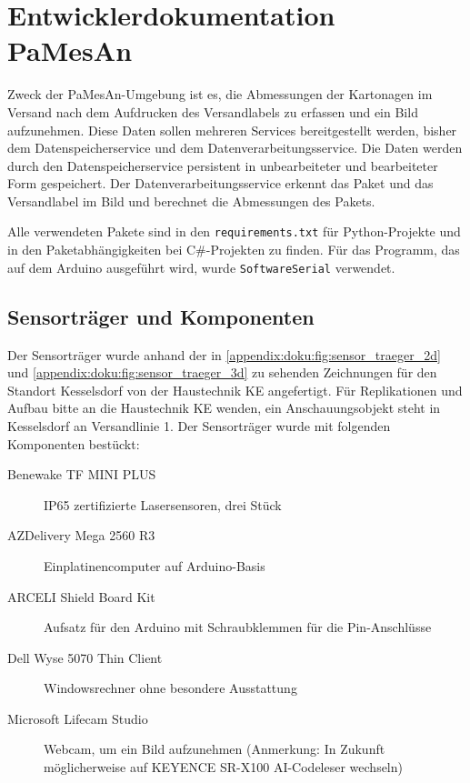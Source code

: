 \section{Entwicklerdokumentation PaMesAn}\label{appendix:sec:dokumentation}

Zweck der PaMesAn-Umgebung ist es, die Abmessungen der Kartonagen im Versand nach dem Aufdrucken des Versandlabels zu erfassen und ein Bild aufzunehmen. Diese Daten sollen mehreren Services bereitgestellt werden, bisher dem Datenspeicherservice und dem Datenverarbeitungsservice. Die Daten werden durch den Datenspeicherservice persistent in unbearbeiteter und bearbeiteter Form gespeichert. Der Datenverarbeitungsservice erkennt das Paket und das Versandlabel im Bild und berechnet die Abmessungen des Pakets.

Alle verwendeten Pakete sind in den \texttt{requirements.txt} für Python-Projekte und in den Paketabhängigkeiten bei C\#-Projekten zu finden. Für das Programm, das auf dem Arduino ausgeführt wird, wurde \texttt{SoftwareSerial} verwendet.


\subsection{Sensorträger und Komponenten}\label{appendix:ssec:doku:sensortraeger}

Der Sensorträger wurde anhand der in \vref{appendix:doku:fig:sensor_traeger_2d} und \vref{appendix:doku:fig:sensor_traeger_3d} zu sehenden Zeichnungen für den Standort Kesselsdorf von der Haustechnik KE angefertigt. Für Replikationen und Aufbau bitte an die Haustechnik KE wenden, ein Anschauungsobjekt steht in Kesselsdorf an Versandlinie 1. Der Sensorträger wurde mit folgenden Komponenten bestückt:

\begin{description}
  \item[Benewake TF MINI PLUS] IP65 zertifizierte Lasersensoren, drei Stück
  \item[AZDelivery Mega 2560 R3] Einplatinencomputer auf Arduino-Basis
  \item[ARCELI Shield Board Kit] Aufsatz für den Arduino mit Schraubklemmen für die Pin-Anschlüsse
  \item[Dell Wyse 5070 Thin Client] Windowsrechner ohne besondere Ausstattung
  \item[Microsoft Lifecam Studio] Webcam, um ein Bild aufzunehmen (Anmerkung: In Zukunft möglicherweise auf KEYENCE SR-X100 AI-Codeleser wechseln)
\end{description}

